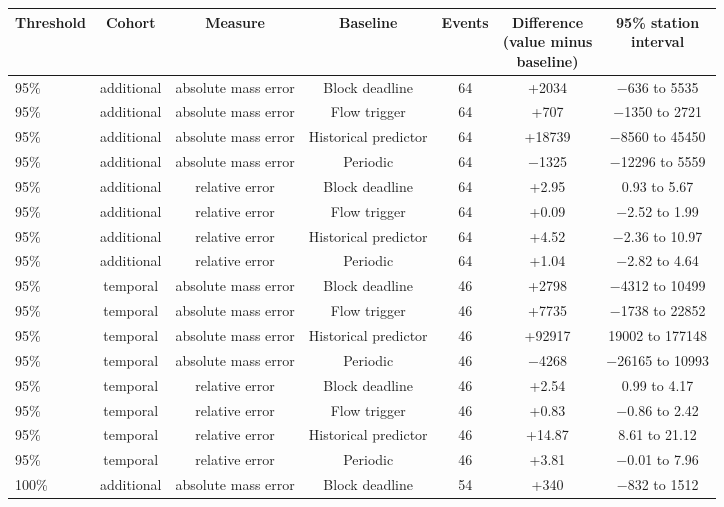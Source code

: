\documentclass[lineno,pdflatex,sn-apa]{sn-jnl}%
\theoremstyle{thmstyleone}%
\theoremstyle{thmstyletwo}%
\theoremstyle{thmstylethree}%
\begin{document}
\begin{center}
\footnotesize
\setlength{\tabcolsep}{2pt}
\begin{tabular}{@{}lcccccc@{}}
\toprule
Threshold & Cohort & Measure & Baseline & Events & \shortstack{Difference\\(value minus\\baseline)} & \shortstack{95\% station\\interval}\\
\midrule
95\% & additional & absolute mass error & Block deadline & 64 & +2034 & $-$636 to 5535\\
95\% & additional & absolute mass error & Flow trigger & 64 & +707 & $-$1350 to 2721\\
95\% & additional & absolute mass error & Historical predictor & 64 & +18739 & $-$8560 to 45450\\
95\% & additional & absolute mass error & Periodic & 64 & $-$1325 & $-$12296 to 5559\\
95\% & additional & relative error & Block deadline & 64 & +2.95 & 0.93 to 5.67\\
95\% & additional & relative error & Flow trigger & 64 & +0.09 & $-$2.52 to 1.99\\
95\% & additional & relative error & Historical predictor & 64 & +4.52 & $-$2.36 to 10.97\\
95\% & additional & relative error & Periodic & 64 & +1.04 & $-$2.82 to 4.64\\
95\% & temporal & absolute mass error & Block deadline & 46 & +2798 & $-$4312 to 10499\\
95\% & temporal & absolute mass error & Flow trigger & 46 & +7735 & $-$1738 to 22852\\
95\% & temporal & absolute mass error & Historical predictor & 46 & +92917 & 19002 to 177148\\
95\% & temporal & absolute mass error & Periodic & 46 & $-$4268 & $-$26165 to 10993\\
95\% & temporal & relative error & Block deadline & 46 & +2.54 & 0.99 to 4.17\\
95\% & temporal & relative error & Flow trigger & 46 & +0.83 & $-$0.86 to 2.42\\
95\% & temporal & relative error & Historical predictor & 46 & +14.87 & 8.61 to 21.12\\
95\% & temporal & relative error & Periodic & 46 & +3.81 & $-$0.01 to 7.96\\
100\% & additional & absolute mass error & Block deadline & 54 & +340 & $-$832 to 1512\\

\end{tabular}
\end{center}
\end{document}
